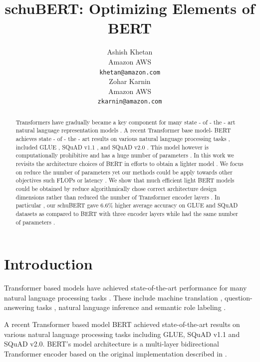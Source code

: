 \documentclass[11pt,a4paper]{article}
\title{schuBERT: Optimizing Elements of BERT}
\author{Ashish Khetan \\
  Amazon AWS \\
  \texttt{khetan@amazon.com} \\\And
  Zohar Karnin \\
 Amazon AWS \\
  \texttt{zkarnin@amazon.com} \\}
\date{}
\begin{document}
\maketitle
\begin{abstract}
Transformers \citep{vaswani2017attention } have gradually became a key component for many state - of - the - art natural language representation models . A recent Transformer base model- BERT \citep{devlin2018bert } achieves state - of - the - art results on various natural language processing tasks , included GLUE , SQuAD v1.1 , and SQuAD v2.0 . This model however is computationally prohibitive and has a huge number of parameters . In this work we revisits the architecture choices of BERT in efforts to obtain a lighter model . We focus on reduce the number of parameters yet our methods could be apply towards other objectives such FLOPs or latency . We show that much efficient light BERT models could be obtained by reduce algorithmically chose correct architecture design dimensions rather than reduced the number of Transformer encoder layers . In particular , our schuBERT gave 6.6\% higher average accuracy on GLUE and SQuAD datasets as compared to BERT with three encoder layers while had the same number of parameters . \end{abstract}

\section{Introduction}
Transformer \citep{vaswani2017attention} based models have achieved state-of-the-art performance for many natural language processing tasks \citep{dai2015semi, peters2018deep, radford2018improving, howard2018universal}. These include machine translation \citep{vaswani2017attention, ott2018scaling}, question-answering tasks \citep{devlin2018bert}, natural language inference \citep{bowman2015large, williams2017broad} and semantic role labeling \citep{strubell2018linguistically}. 

A recent Transformer based model BERT \citep{devlin2018bert} achieved state-of-the-art results on various natural language processing tasks including GLUE, SQuAD v1.1 and SQuAD v2.0. BERT's model architecture is a multi-layer bidirectional Transformer 
encoder based on the original implementation described in \citet{vaswani2017attention}. 
\end{document}
